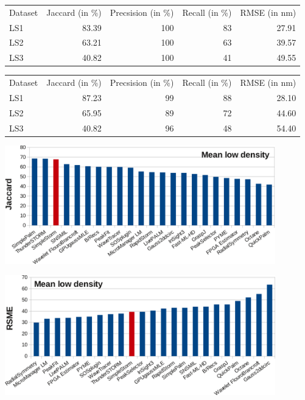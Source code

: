 \begin{center}
\label{resls2}
\begin{tabular}{lrrrr}
Dataset&Jaccard (in \%)&Precsision (in \%)& Recall (in \%) & RMSE (in nm)\\
LS1&83.39&100&83&27.91\\
LS2&63.21&100&63&39.57\\
LS3&40.82&100&41&49.55
\end{tabular}
\end{center}

\begin{center}
\label{resls3}
\begin{tabular}{lrrrr}
Dataset&Jaccard (in \%)&Precsision (in \%)& Recall (in \%) & RMSE (in nm)\\
LS1&87.23&99&88&28.10\\
LS2&65.95&89&72&44.60\\
LS3&40.82&96&48&54.40
\end{tabular}
\end{center}



\begin{center}
\includegraphics[width = 0.88\textwidth]{pictures/diagrammsChallenge/MeanLowDensityJaccardCropped.pdf}
	\label{meanJaccardLowDensity}
\end{center}

\begin{center}
\includegraphics[width = 0.88\textwidth]{pictures/diagrammsChallenge/MeanLowDensityRSMECropped.pdf}
	\label{meanRSMELowDensity}
\end{center}

